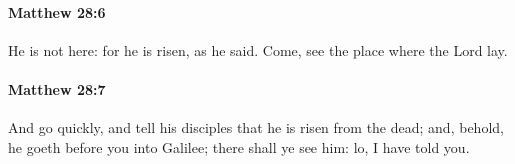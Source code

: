 		\paragraph{Matthew 28:6} %
			\label{MATTHEW-28-6}

			He is not here: for he is risen, as he said. Come, see the place where the Lord lay.

			\begin{framed}
			\scriptsize
				\begin{compactdesc}
					\item[SBLG] 
				\end{compactdesc}
			\end{framed}

		\paragraph{Matthew 28:7} %
			\label{MATTHEW-28-7}

			And go quickly, and tell his disciples that he is risen from the dead; and, behold, he goeth before you into Galilee; there shall ye see him: lo, I have told you.

